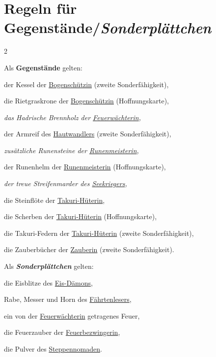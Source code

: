 \documentclass[10pt, a4paper, oneside]{book}
\newcommand{\fan}[1]{\textit{#1}}
\begin{document}
\chapter{Regeln für Gegenstände/\fan{Sonderplättchen}}
\label{gegenstaende-und-sonderplaettchen}


\begin{multicols*}{2}\raggedcolumns



Als \textbf{Gegenstände} gelten:


\bullet{} der Kessel der \hyperref[bogenschuetzin]{Bogenschützin} (zweite Sonderfähigkeit),

\bullet{} die Rietgraskrone der \hyperref[bogenschuetzin]{Bogenschützin} (Hoffnungskarte),

\bullet{} \fan{das Hadrische Brennholz der \hyperref[feuerwaechterin]{Feuerwächterin},}

\bullet{} der Armreif des \hyperref[hautwandler]{Hautwandlers} (zweite Sonderfähigkeit),

\bullet{} \fan{zusätzliche Runensteine der \hyperref[runenmeisterin]{Runenmeisterin},}

\bullet{} der Runenhelm der \hyperref[runenmeisterin]{Runenmeisterin} (Hoffnungskarte),

\bullet{} \fan{der treue Streifenmarder des \hyperref[seekrieger]{Seekriegers},}

\bullet{} die Steinflöte der \hyperref[takuri-hueterin]{Takuri-Hüterin},

\bullet{} die Scherben der \hyperref[takuri-hueterin]{Takuri-Hüterin} (Hoffnungskarte),

\bullet{} die Takuri-Federn der \hyperref[takuri-hueterin]{Takuri-Hüterin} (zweite Sonderfähigkeit),

\bullet{} die Zauberbücher der \hyperref[zauberin]{Zauberin} (zweite Sonderfähigkeit).
\bigskip




Als \textbf{\fan{Sonderplättchen}} gelten:

\bullet{} die Eisblitze des \hyperref[eis-daemon]{Eis-Dämons},

\bullet{} Rabe, Messer und Horn des \hyperref[faehrtenleser]{Fährtenlesers},

\bullet{} ein von der \hyperref[feuerwaechterin]{Feuerwächterin} getragenes Feuer,

\bullet{} die Feuerzauber der \hyperref[feuerbezwingerin]{Feuerbezwingerin},

\bullet{} die Pulver des \hyperref[steppennomade]{Steppennomaden}.






\end{multicols*}
\end{document}
